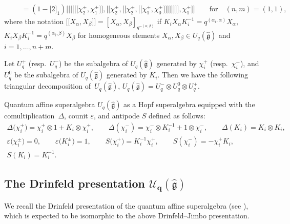 \documentclass[10pt,a4paper]{amsart}
\numberwithin{equation}{section}
\begin{document}
\begin{Definition}
\begin{gather*}
\qquad =(1-\bigl[2\bigr]_1)\bigl[\!\!\bigl[ \bigl[\!\!\bigl[ \bigl[\!\!\bigl[\chi_2^{\pm}, \chi_1^{\pm}\bigr]\!\!\bigr], \bigl[\!\!\bigl[\chi_2^{\pm}, \bigl[\!\!\bigl[\chi_2^{\pm}, \bigl[\!\!\bigl[\chi_1^{\pm}, \chi_0^{\pm}\bigr]\!\!\bigr] \bigr]\!\!\bigr] \bigr]\!\!\bigr] \bigr]\!\!\bigr], \chi_1^{\pm}\bigr]\!\!\bigr]\qquad\textrm{for}\quad (n,m)=(1,1),
\end{gather*}
where the notation $\bigl[\!\!\bigl[X_{\alpha}, X_{\beta}\bigr]\!\!\bigr]=[X_{\alpha}, X_{\beta}]_{q^{-(\alpha,\beta)}}$ if $K_iX_{\alpha}K_i^{-1}=q^{(\alpha_i,\alpha)}X_{\alpha}$, $K_iX_{\beta}K_i^{-1}=q^{(\alpha_i,\beta)}X_{\beta}$ for homogeneous elements $X_{\alpha},X_{\beta}\in U_q(\mathfrak{\hat{g}})$ and $i=1,\ldots,n+m$.
\end{Definition}

Let $U_q^{+}$ (resp.\ $U_q^{-}$) be the subalgebra of $U_q(\mathfrak{\hat{g}})$ generated by $\chi_i^{+}$ (resp.\ $\chi_i^{-}$), and $U_q^{0}$ be the subalgebra of $U_q(\mathfrak{\hat{g}})$ generated by $K_i$. Then we have the following triangular decomposition of~$U_q(\mathfrak{\hat{g}})$,
$U_q(\mathfrak{\hat{g}})=U_q^{-}\otimes U_q^{0}\otimes U_q^{+}$.

Quantum affine superalgebra $U_q(\mathfrak{\hat{g}})$
as a
Hopf superalgebra equipped with the comultiplication~$\Delta$, counit $\varepsilon$, and antipode $S$ defined as follows:
\begin{gather*}
 \Delta\bigl(\chi_i^{+}\bigr) = \chi_i^{+}\otimes 1 + K_i\otimes\chi_i^{+},\qquad
 \Delta(\chi_i^{-}) = \chi_i^{-}\otimes K_i^{-1} + 1\otimes\chi_i^{-}, \qquad
 \Delta(K_i) = K_i\otimes K_i,\\ \varepsilon\bigl(\chi_i^{\pm}\bigr) = 0,\qquad \varepsilon\bigl(K_i^{\pm}\bigr) = 1,\qquad
 S\bigl(\chi_i^{+}\bigr) = K_i^{-1}\chi_i^{+},\qquad S(\chi_i^{-}) = -\chi_i^{+}K_i, \\ S(K_i) = K_i^{-1}.
\end{gather*}

\subsection[The Drinfeld presentation U\_q(g)]{The Drinfeld presentation $\boldsymbol{\mathcal{U}_q(\mathfrak{\hat{g}})}$ }

We recall the Drinfeld presentation of the quantum affine superalgebra (see \cite{Bezerra, XWLHZ,HYAM}), which is expected to be isomorphic to the above Drinfeld--Jimbo presentation.
\end{document}
